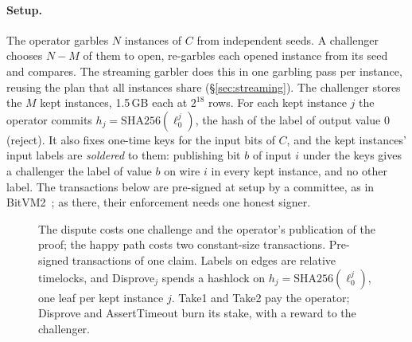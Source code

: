 \documentclass[11pt]{article}
\begin{document}
\paragraph{Setup.} The operator garbles $N$ instances of $C$ from independent
seeds. A challenger chooses $N-M$ of them to open, re-garbles each opened
instance from its seed and compares. The streaming garbler does this in one
garbling pass per instance, reusing the plan that all instances share
(\S\ref{sec:streaming}). The challenger stores the $M$ kept instances, 1.5\,GB
each at $2^{18}$ rows. For each kept instance $j$ the operator commits
$h_j=\mathrm{SHA256}(\ell^j_0)$, the hash of the label of output value 0
(reject). It also fixes
one-time keys for the input bits of $C$, and the kept instances' input labels
are \emph{soldered} to them: publishing bit $b$ of input $i$ under the keys gives
a challenger the label of value $b$ on wire $i$ in every kept instance, and no
other label. The transactions below are pre-signed at setup by a committee, as in
BitVM2~\cite{laa25bitvm2}; as there, their enforcement needs one honest signer.

\begin{figure}[t]\centering
{}
\caption{The dispute costs one challenge and the operator's publication of the proof;
the happy path costs two constant-size transactions. Pre-signed transactions of one
claim. Labels on edges are relative timelocks, and Disprove$_j$ spends a hashlock
on $h_j=\mathrm{SHA256}(\ell^j_0)$, one leaf per kept instance $j$. Take1 and Take2 pay the operator;
Disprove and AssertTimeout burn its stake, with a reward to the challenger.}
\label{fig:graph}
\end{figure}
\end{document}
